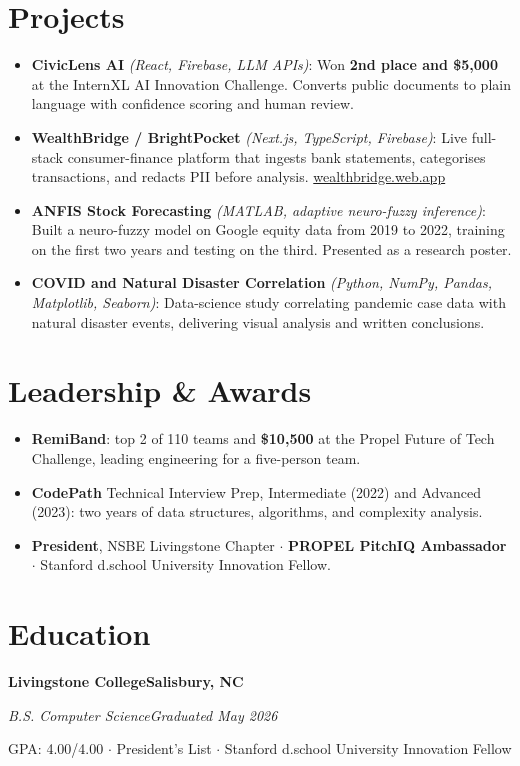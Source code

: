 \documentclass[letterpaper,10pt]{article}
\newcommand{\headrow}[2]{{\rightskip=0pt\noindent#1\hfill#2\par}}
\newcommand{\role}[4]{%
  \headrow{\textbf{#1}}{\textbf{#2}}%
  \headrow{\textit{#3}}{\textit{#4}}%
  \vspace{0.1em}%
}
\newenvironment{bullets}
  {\begin{itemize}[leftmargin=1.15em, itemsep=0.13em, parsep=0pt, topsep=0.22em, partopsep=0pt]}
  {\end{itemize}\vspace{0.3em}}
\begin{document}
\section{Projects}

\begin{bullets}
  \item \textbf{CivicLens AI} \textit{(React, Firebase, LLM APIs)}: Won \textbf{2nd place and
        \$5,000} at the InternXL AI Innovation Challenge. Converts public documents to plain
        language with confidence scoring and human review.
  \item \textbf{WealthBridge / BrightPocket} \textit{(Next.js, TypeScript, Firebase)}: Live
        full-stack consumer-finance platform that ingests bank statements, categorises
        transactions, and redacts PII before analysis.
        \href{https://wealthbridge.web.app}{wealthbridge.web.app}
  \item \textbf{ANFIS Stock Forecasting} \textit{(MATLAB, adaptive neuro-fuzzy inference)}:
        Built a neuro-fuzzy model on Google equity data from 2019 to 2022, training on the
        first two years and testing on the third. Presented as a research poster.
  \item \textbf{COVID and Natural Disaster Correlation} \textit{(Python, NumPy, Pandas,
        Matplotlib, Seaborn)}: Data-science study correlating pandemic case data with natural
        disaster events, delivering visual analysis and written conclusions.
\end{bullets}

\section{Leadership \& Awards}

\begin{bullets}
  \item \textbf{RemiBand}: top 2 of 110 teams and \textbf{\$10,500} at the Propel Future of
        Tech Challenge, leading engineering for a five-person team.
  \item \textbf{CodePath} Technical Interview Prep, Intermediate (2022) and Advanced (2023):
        two years of data structures, algorithms, and complexity analysis.
  \item \textbf{President}, NSBE Livingstone Chapter $\cdot$ \textbf{PROPEL PitchIQ Ambassador}
        $\cdot$ Stanford d.school University Innovation Fellow.
\end{bullets}

\section{Education}

\role{Livingstone College}{Salisbury, NC}{B.S. Computer Science}{Graduated May 2026}
GPA: 4.00/4.00 $\cdot$ President's List $\cdot$ Stanford d.school University Innovation Fellow
\end{document}
